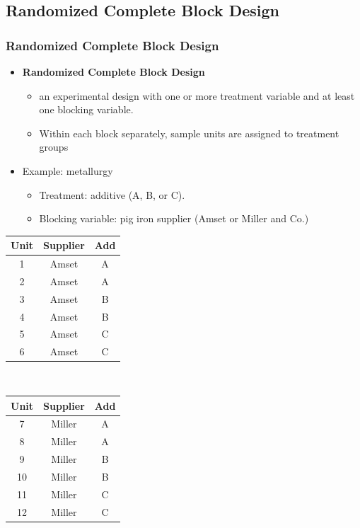\documentclass[handout]{beamer}
\numberwithin{equation}{section}
\begin{document}
\subsection{Randomized Complete Block Design}


\begin{frame}
\frametitle{Randomized Complete Block Design} \small

\begin{itemize}
\item {\bf Randomized Complete Block Design} 
\begin{itemize}
\pause \item an experimental design with one or more treatment variable and at least one blocking variable.
\pause \item Within each block separately, sample units are assigned to treatment groups 
\end{itemize} 
\pause \item Example: metallurgy
\begin{itemize}
\item Treatment: additive (A, B, or C).
\pause \item Blocking variable: pig iron supplier (Amset or Miller and Co.)
\end{itemize} 
\end{itemize}
\scriptsize
\begin{center}
\begin{tabular}{c|c|c}
Unit & Supplier & Add\\ \hline
1 & Amset & A \\ 
2 & Amset & A \\ 
3 & Amset & B \\ 
4 & Amset & B \\ 
5 & Amset & C \\
6 & Amset & C \\
\end{tabular} $\quad$ \begin{tabular}{c|c|c}
Unit & Supplier & Add \\ \hline
7 & Miller & A \\ 
8 & Miller & A \\ 
9 & Miller & B \\ 
10 & Miller & B \\ 
11 & Miller & C \\ 
12 & Miller & C \\ 
\end{tabular}
\end{center}
\end{frame}
\end{document}
